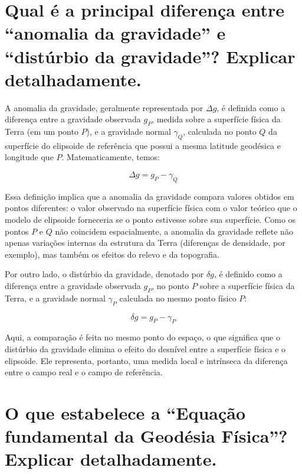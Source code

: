 \section{Qual é a principal diferença entre “anomalia da gravidade” e “distúrbio da gravidade”? Explicar detalhadamente.}

A anomalia da gravidade, geralmente representada por \( \Delta g \), é definida como a diferença entre a gravidade observada \( g_P \), medida sobre a superfície física da Terra (em um ponto \( P \)), e a gravidade normal \( \gamma_Q \), calculada no ponto \( Q \) da superfície do elipsoide de referência que possui a mesma latitude geodésica e longitude que \( P \). Matematicamente, temos:

\[
\Delta g = g_P - \gamma_Q
\]

\noindent
Essa definição implica que a anomalia da gravidade compara valores obtidos em pontos diferentes: o valor observado na superfície física com o valor teórico que o modelo de elipsoide forneceria se o ponto estivesse sobre sua superfície. Como os pontos \( P \) e \( Q \) não coincidem espacialmente, a anomalia da gravidade reflete não apenas variações internas da estrutura da Terra (diferenças de densidade, por exemplo), mas também os efeitos do relevo e da topografia. 

Por outro lado, o distúrbio da gravidade, denotado por \( \delta g \), é definido como a diferença entre a gravidade observada \( g_P \), no ponto \( P \) sobre a superfície física da Terra, e a gravidade normal \( \gamma_P \) calculada no mesmo ponto físico \( P \):

\[
\delta g = g_P - \gamma_P
\]

\noindent
Aqui, a comparação é feita no mesmo ponto do espaço, o que significa que o distúrbio da gravidade elimina o efeito do desnível entre a superfície física e o elipsoide. Ele representa, portanto, uma medida local e intrínseca da diferença entre o campo real e o campo de referência.


\section{O que estabelece a “Equação fundamental da Geodésia Física”? Explicar detalhadamente.}


